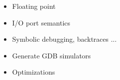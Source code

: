 \begin{block}{\large {}\vphantom{Future Work}}
    \begin{itemize}
        \item Floating point
        \item I/O port semantics
        \item Symbolic debugging, backtraces ...
        \item Generate GDB simulators
        \item Optimizations
    \end{itemize}
\end{block}
